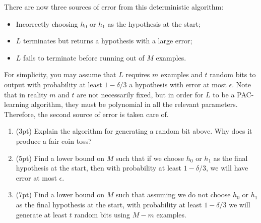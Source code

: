 \documentclass[11pt]{article}
\DeclareMathOperator{\1}{\mathbbm{1}}
\begin{document}
\begin{problem}
There are now three sources of error from this deterministic algorithm:
\begin{itemize}
\item Incorrectly choosing $h_0$ or $h_1$ as the hypothesis at the start;
\item $L$ terminates but returns a hypothesis with a large error;
\item $L$ fails to terminate before running out of $M$ examples. 
\end{itemize}

For simplicity, you may assume that $L$ requires $m$ examples and $t$ random bits
to output with probability at least $1-\delta/3$ a hypothesis with error at most
$\epsilon$. Note that in reality $m$ and $t$ are not necessarily fixed, but in order for $L$ 
to be a PAC-learning algorithm, they must be polynomial in all the relevant parameters.
Therefore, the second source of error is taken care of. 

\begin{enumerate}
\item (3pt) Explain the algorithm for generating a random bit above. Why does it produce a fair coin toss? 
\item (5pt) Find a lower bound on $M$ such that if we choose $h_0$ or $h_1$ as the 
final hypothesis at the start, then with probability at least $1-\delta/3$, we
will have error at most $\epsilon$.   
\item (7pt) Find a lower bound on $M$ such that assuming we do not choose $h_0$ or $h_1$ as the final hypothesis at the start, with probability at least $1-\delta/3$ we will generate at least $t$ random bits using $M-m$ examples. 
\end{enumerate}
\end{problem}
\end{document}
